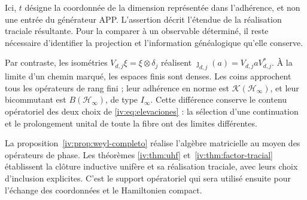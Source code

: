 Ici, \(t\) désigne la coordonnée de la dimension représentée
dans l’adhérence, et non une entrée du générateur APP. L’assertion
décrit l’étendue de la réalisation traciale résultante. Pour
la comparer à un observable déterminé, il reste nécessaire
d’identifier la projection et l’information généalogique qu’elle conserve.

Par contraste, les isométries \(V_{d,j}\xi=\xi\otimes\delta_j\) réalisent \(\jmath_{d,j}(a)=V_{d,j}aV_{d,j}^*\). À la limite d'un chemin marqué, les espaces finis sont denses. Les coins approchent tous les opérateurs de rang fini ; leur adhérence en norme est \(\mathcal K(\mathcal H_\infty)\), et leur bicommutant est \(B(\mathcal H_\infty)\), de type \(I_\infty\). Cette différence conserve le contenu opératoriel des deux choix de \eqref{iv:eq:elevaciones} : la sélection d'une continuation et le prolongement unital de toute la fibre ont des limites différentes.

La proposition~\ref{iv:prop:weyl-completo} réalise l’algèbre
matricielle au moyen des opérateurs de phase. Les théorèmes
\ref{iv:thm:uhf} et~\ref{iv:thm:factor-tracial} établissent la clôture
inductive unifère et sa réalisation traciale, avec leurs choix
d’inclusion explicites. C’est le support opératoriel qui sera utilisé
ensuite pour l’échange des coordonnées et le Hamiltonien compact.
